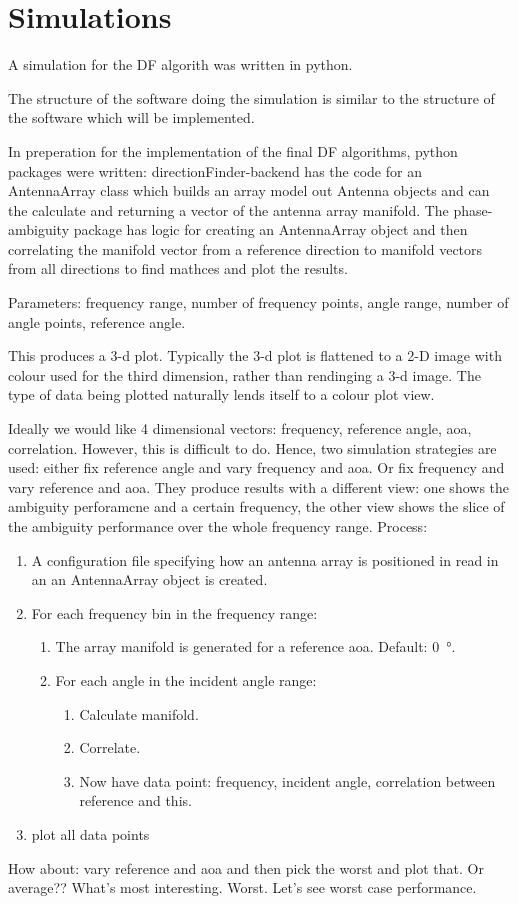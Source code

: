 \chapter{Simulations}
\label{ch:simulations}

A simulation for the DF algorith was written in python.

The structure of the software doing the simulation is similar to the structure of the software which will be implemented.

In preperation for the implementation of the final DF algorithms, python packages were written: 
directionFinder-backend has the code for an AntennaArray class which builds an array model out Antenna objects and can the calculate and returning a vector of the antenna array manifold. The phase-ambiguity package has logic for creating an AntennaArray object and then correlating the manifold vector from a reference direction to manifold vectors from all directions to find mathces and plot the results.

Parameters:
frequency range, number of frequency points, angle range, number of angle points, reference angle.

This produces a 3-d plot. Typically the 3-d plot is flattened to a 2-D image with colour used for the third dimension, rather than rendinging a 3-d image. The type of data being plotted naturally lends itself to a colour plot view.


Ideally we would like 4 dimensional vectors: frequency, reference angle, aoa, correlation. However, this is difficult to do. Hence, two simulation strategies are used: either fix reference angle and vary frequency and aoa. Or fix frequency and vary reference and aoa. They produce results with a different view: one shows the ambiguity perforamcne and a certain frequency, the other view shows the slice of the ambiguity performance over the whole frequency range. Process:

\begin{enumerate}
  \item A configuration file specifying how an antenna array is positioned in read in an an AntennaArray object is created.
  \item For each frequency bin in the frequency range:
  \begin{enumerate}
    \item The array manifold is generated for a reference \gls{aoa}. Default: \SI{0}{\degree}.
    \item For each angle in the incident angle range:
    \begin{enumerate}
      \item Calculate manifold.
      \item Correlate.
      \item Now have data point: frequency, incident angle, correlation between reference and this.
    \end{enumerate}
  \end{enumerate}
  \item plot all data points
\end{enumerate}

How about: vary reference and aoa and then pick the worst and plot that. Or average?? What's most interesting. Worst. Let's see worst case performance. 
